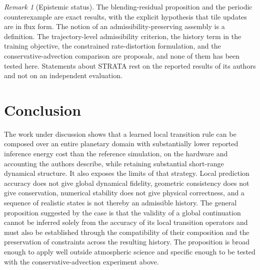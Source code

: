 \documentclass[11pt]{article}
\theoremstyle{definition}
\theoremstyle{remark}
\newtheorem{remark}{Remark}
\begin{document}
\begin{remark}[Epistemic status]
The blending-residual proposition and the periodic counterexample are exact results, with the explicit hypothesis that tile updates are in flux form. The notion of an admissibility-preserving assembly is a definition. The trajectory-level admissibility criterion, the history term in the training objective, the constrained rate-distortion formulation, and the conservative-advection comparison are proposals, and none of them has been tested here. Statements about STRATA rest on the reported results of its authors and not on an independent evaluation.
\end{remark}

\section{Conclusion}

The work under discussion shows that a learned local transition rule can be composed over an entire planetary domain with substantially lower reported inference energy cost than the reference simulation, on the hardware and accounting the authors describe, while retaining substantial short-range dynamical structure. It also exposes the limits of that strategy. Local prediction accuracy does not give global dynamical fidelity, geometric consistency does not give conservation, numerical stability does not give physical correctness, and a sequence of realistic states is not thereby an admissible history. The general proposition suggested by the case is that the validity of a global continuation cannot be inferred solely from the accuracy of its local transition operators and must also be established through the compatibility of their composition and the preservation of constraints across the resulting history. The proposition is broad enough to apply well outside atmospheric science and specific enough to be tested with the conservative-advection experiment above.
\end{document}
